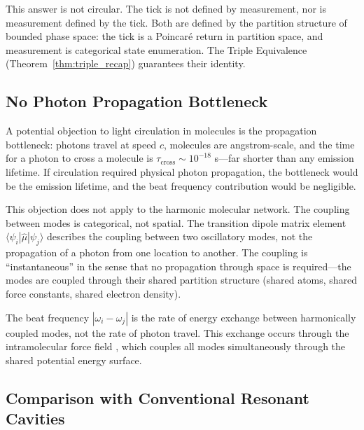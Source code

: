 \documentclass[11pt,twocolumn,a4paper]{article}
\theoremstyle{definition}
\theoremstyle{remark}
\begin{document}
This answer is not circular. The tick is not defined by measurement, nor is measurement defined by the tick. Both are defined by the partition structure of bounded phase space: the tick is a Poincar\'{e} return in partition space, and measurement is categorical state enumeration. The Triple Equivalence (Theorem~\ref{thm:triple_recap}) guarantees their identity.

\subsection{No Photon Propagation Bottleneck}

A potential objection to light circulation in molecules is the propagation bottleneck: photons travel at speed $c$, molecules are angstrom-scale, and the time for a photon to cross a molecule is $\tau_{\mathrm{cross}} \sim 10^{-18}$ s---far shorter than any emission lifetime. If circulation required physical photon propagation, the bottleneck would be the emission lifetime, and the beat frequency contribution would be negligible.

This objection does not apply to the harmonic molecular network. The coupling between modes is categorical, not spatial. The transition dipole matrix element $\langle \psi_i | \hat{\mu} | \psi_j \rangle$ describes the coupling between two oscillatory modes, not the propagation of a photon from one location to another. The coupling is ``instantaneous'' in the sense that no propagation through space is required---the modes are coupled through their shared partition structure (shared atoms, shared force constants, shared electron density).

The beat frequency $|\omega_i - \omega_j|$ is the rate of energy exchange between harmonically coupled modes, not the rate of photon travel. This exchange occurs through the intramolecular force field \citep{wilson1955}, which couples all modes simultaneously through the shared potential energy surface.

\subsection{Comparison with Conventional Resonant Cavities}
\end{document}
